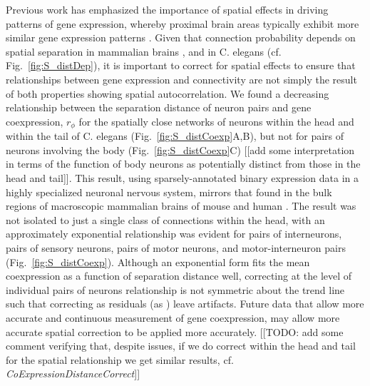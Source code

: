 \documentclass[10pt,letterpaper]{article}
\begin{document}
Previous work has emphasized the importance of spatial effects in driving patterns of gene expression, whereby proximal brain areas typically exhibit more similar gene expression patterns \citep{Pantazatos:2016ir, Krienen2016, Fulcher:2016ck}.
Given that connection probability depends on spatial separation in mammalian brains \cite{Henderson:2014fg, Horvat:2016ia, Wang:2016gg}, and in C. elegans (cf. Fig.~\ref{fig:S_distDep}), it is important to correct for spatial effects to ensure that relationships between gene expression and connectivity are not simply the result of both properties showing spatial autocorrelation.
We found a decreasing relationship between the separation distance of neuron pairs and gene coexpression, $r_\phi$ for the spatially close networks of neurons within the head and within the tail of C. elegans (Fig.~\ref{fig:S_distCoexp}A,B), but not for pairs of neurons involving the body (Fig.~\ref{fig:S_distCoexp}C) [[add some interpretation in terms of the function of body neurons as potentially distinct from those in the head and tail]].
This result, using sparsely-annotated binary expression data in a highly specialized neuronal nervous system, mirrors that found in the bulk regions of macroscopic mammalian brains of mouse \cite{Fulcher:2016ck} and human \cite{Krienen:2016eq}.
The result was not isolated to just a single class of connections within the head, with an approximately exponential relationship was evident for pairs of interneurons, pairs of sensory neurons, pairs of motor neurons, and motor-interneuron pairs (Fig.~\ref{fig:S_distCoexp}).
Although an exponential form fits the mean coexpression as a function of separation distance well, correcting at the level of individual pairs of neurons relationship is not symmetric about the trend line such that correcting as residuals (as \citet{Fulcher:2016ck}) leave artifacts.
Future data that allow more accurate and continuous measurement of gene coexpression, may allow more accurate spatial correction to be applied more accurately.
[[TODO: add some comment verifying that, despite issues, if we do correct within the head and tail for the spatial relationship we get similar results, cf. \emph{CoExpressionDistanceCorrect}]]
\end{document}
